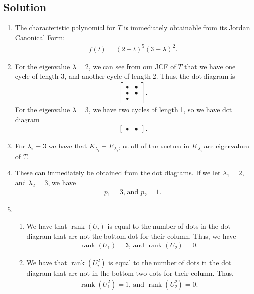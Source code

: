 \documentclass[10pt,a4paper]{article}
\theoremstyle{definition}
\DeclareMathOperator\rank{rank}
\begin{document}
\subsection*{Solution}
\begin{enumerate}
\item The characteristic polynomial for $T$ is immediately obtainable from its Jordan Canonical Form:
\begin{align*}
f(t) = (2 - t)^5 (3 - \lambda)^2.
\end{align*}

\item For the eigenvalue $\lambda = 2$, we can see from our JCF of $T$ that we have one cycle of length $3$, and another cycle of length $2$. Thus, the dot diagram is
\begin{align*}
\begin{bmatrix}
\bullet & \bullet\\
\bullet & \bullet\\
\bullet & 
\end{bmatrix}.
\end{align*}
For the eigenvalue $\lambda = 3$, we have two cycles of length 1, so we have dot diagram
\begin{align*}
\begin{bmatrix}
\bullet & \bullet
\end{bmatrix}.
\end{align*}

\item For $\lambda_i = 3$ we have that $K_{\lambda_i} = E_{\lambda_i}$, as all of the vectors in $K_{\lambda_i}$ are eigenvalues of $T$.

\item These can immediately be obtained from the dot diagrams. If we let $\lambda_1 = 2$, and $\lambda_2 = 3$, we have
\begin{align*}
p_1 = 3 \text{, and } p_2 = 1.
\end{align*}

\item \begin{enumerate}
\item We have that $\rank(U_i)$ is equal to the number of dots in the dot diagram that are not the bottom dot for their column. Thus, we have
\begin{align*}
\rank(U_1) = 3 \text{, and } \rank(U_2) = 0.
\end{align*}

\item We have that $\rank(U_i^2)$ is equal to the number of dots in the dot diagram that are not in the bottom two dots for their column. Thus, 
\begin{align*}
\rank(U_1^2) = 1 \text{, and } \rank(U_2^2) = 0.
\end{align*}


\end{enumerate}
\end{enumerate}
\end{document}
